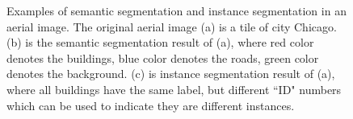 \begin{figure}[!h]
{	}
    \caption[Examples of semantic and instance segmentation in an aerial image]{Examples of semantic segmentation and instance segmentation in an aerial image. The original aerial image (a) is a tile of city Chicago. (b) is the semantic segmentation result of (a), where red color denotes the buildings, blue color denotes the roads, green color denotes the background. (c) is instance segmentation result of (a), where all buildings have the same label, but different ``ID" numbers which can be used to indicate they are different instances.}
	\label{fig:arseg}
\end{figure}